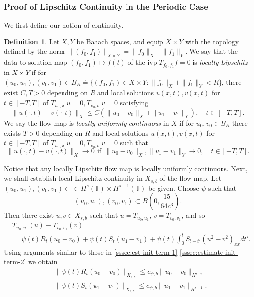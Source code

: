 \documentclass[12pt,reqno]{amsart}
\numberwithin{equation}{section}  %
\numberwithin{figure}{section}
\newcommand{\ci}{\mathbb{T}}
\theoremstyle{plain}
\theoremstyle{definition}
\newtheorem{definition}{Definition}
\theoremstyle{remark}
\begin{document}
\subsubsection{Proof of Lipschitz Continuity in the Periodic Case} 
\label{sssec:lip-continuity}
%
%
We first define our notion of continuity.
%
%
\begin{definition}
  Let $X, Y$ be Banach spaces, and equip $X \times Y$ with the 
  topology defined by the norm $\|(f_0, f_1)\|_{X \times Y}
  = \|f_0\|_{X} + \|f_1\|_{Y}$.
  We say that the data to solution
  map $(f_0, f_1) \mapsto f(t)$ of the ivp $T_{f_0, f_1} f =
  0$ is \emph{locally Lipschitz} in $X \times Y$ if for
  $(u_0, u_1), (v_0, v_1) \in B_R \doteq \{(f_0,f_1) \in X \times Y: \|f_0\|_{X} +
  \|f_1\|_{Y}< R\}$, there exist $C, T>0$ depending on $R$ and local solutions
  $u(x,t), v(x,t)$
  for $t \in [-T, T]$ of $T_{u_0, u_1}u=0, T_{v_0, v_1}v=0$ satisfying
	$$\|u(\cdot, t) - v(\cdot, t)
  \|_X \le C \left( \|u_{0} - v_0 \|_{X} + \|u_{1} - v_1 \|_{Y}
  \right), \quad t \in [-T, T].$$ We
	say the flow map is \emph{locally uniformly
	continuous} in $X$ if for
	$u_0, v_0 \in B_R$ there exists $T >0$ depending on $R$ and local solutions
  $u(x,t), v(x,t)$
  for $t \in [-T, T]$ of $T_{u_0, u_1}u=0, T_{v_0, v_1}v=0$ such that 
	$$ \|u(\cdot, t) - v(\cdot, t) \|_{X} \to
  0 \ \ \text{if}  \ \ \|u_0 - v_0 \|_{X}, \|u_1 - v_1 \|_{Y} \to 0, \quad
  t \in
  [-T, T]. $$ 
\end{definition}
%
%
Notice that any locally Lipschitz flow map is locally uniformly continuous. 
Next, we shall establish local Lipschitz continuity in $X_{s,b}$ of the flow
map. Let $(u_0, u_1), (v_0, v_1) \subset \in H^{s}(\ci) \times H^{s-1}(\ci)  $
be given. Choose $\psi$ such that $$(u_0, u_1), (v_0, v_1)  \subset B(0,
\frac{15}{64c^{3}}).$$ Then there exist $u, v \in X_{s,b}$ such that $u =
T_{u_0, u_1}$, $v = T_{v_0, v_1}$, and so
%
%
\begin{equation}
	\label{gen-1a}
	\begin{split}
		& T_{u_0, u_1}(u) - T_{v_0, v_1}(v)
		\\
    & = \psi(t ) R_{t}(u_{0} - v_0) + \psi(t) S_{t}(u_{1} - v_1)
    + \psi(t) \int_{0}^{t} S_{t-t'}
    (u^{2} - v^{2} )_{xx} dt'.
		\end{split}
\end{equation}
%
%
Using arguments similar to those in 
\autoref{sssec:est-init-term-1}-\autoref{sssec:estimate-init-term-2}
we obtain
%
%
\begin{equation}
	\label{gen-2a}
	\begin{split}
		& \| \psi(t ) R_t (u_0 - v_0)\|_{X_{s,b}}
		\le c_{\psi, b} \|u_0 -v_0\|_{H^s},
    \\
    & \| \psi(t) S_t (u_1 - v_1)\|_{X_{s,b}}
    \le c_{\psi, b} \|u_1 -v_1\|_{H^{s-1}}.
	\end{split}
\end{equation}
\end{document}
